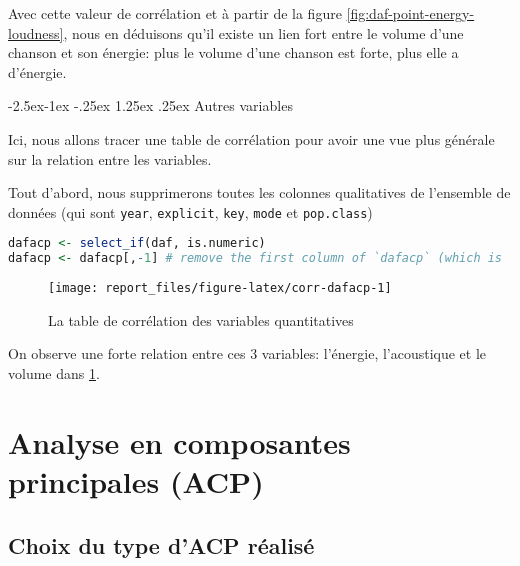 \documentclass[
  11pt,
  xcolor = usenames,dvipsnames]{article}
\makeatletter
\newcommand{\passthrough}[1]{#1}
\renewcommand\paragraph{\@startsection{paragraph}{4}{\z@}%
        {-2.5ex\@plus -1ex \@minus -.25ex}%
        {1.25ex \@plus .25ex}%
        {\normalfont\normalsize\bfseries}}
\makeatother
\begin{document}
Avec cette valeur de corrélation et à partir de la figure \ref{fig:daf-point-energy-loudness},
nous en déduisons qu'il existe un lien fort entre le volume d'une chanson et son énergie:
plus le volume d'une chanson est forte, plus elle a d'énergie.

\hypertarget{autres-variables}{%
\paragraph{Autres variables}\label{autres-variables}}

Ici, nous allons tracer une table de corrélation pour avoir une vue plus générale sur la relation entre les variables.

Tout d'abord, nous supprimerons toutes les colonnes qualitatives de
l'ensemble de données (qui sont \passthrough{\lstinline!year!}, \passthrough{\lstinline!explicit!}, \passthrough{\lstinline!key!}, \passthrough{\lstinline!mode!} et \passthrough{\lstinline!pop.class!})

\begin{lstlisting}[language=R]
dafacp <- select_if(daf, is.numeric)
dafacp <- dafacp[,-1] # remove the first column of `dafacp` (which is `year`)
\end{lstlisting}

\begin{figure}

{\centering \texttt{[image: report\_files/figure-latex/corr-dafacp-1]} 

}

\caption{La table de corrélation des variables quantitatives}\label{fig:corr-dafacp}
\end{figure}

On observe une forte relation entre ces 3 variables: l'énergie, l'acoustique et le volume dans \ref{fig:corr-dafacp}.

\hypertarget{analyse-en-composantes-principales-acp}{%
\section{Analyse en composantes principales (ACP)}\label{analyse-en-composantes-principales-acp}}

\hypertarget{choix-du-type-dacp-ruxe9alisuxe9}{%
\subsection{Choix du type d'ACP réalisé}\label{choix-du-type-dacp-ruxe9alisuxe9}}
\end{document}
